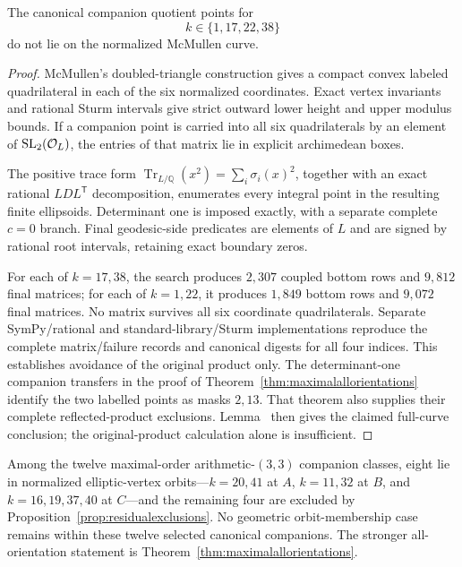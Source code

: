 \begin{proposition}\label{prop:residualexclusions}
The canonical companion quotient points for
\[
 k\in\{1,17,22,38\}
\]
do not lie on the normalized McMullen curve.
\end{proposition}
\begin{proof}
McMullen's doubled-triangle construction gives a compact convex labeled
quadrilateral in each of the six normalized coordinates.  Exact vertex
invariants and rational Sturm intervals give strict outward lower height and
upper modulus bounds.  If a companion point is carried into all six
quadrilaterals by an element of $\mathrm{SL}_2(\mathcal O_L)$, the entries of that
matrix lie in explicit archimedean boxes.

The positive trace form
$\operatorname{Tr}_{L/\mathbb Q}(x^2)=\sum_i\sigma_i(x)^2$, together with an
exact rational $LDL^{\mathsf T}$ decomposition, enumerates every integral
point in the resulting finite ellipsoids.  Determinant one is imposed exactly,
with a separate complete $c=0$ branch.  Final geodesic-side predicates are
elements of $L$ and are signed by rational root intervals, retaining exact
boundary zeros.

For each of $k=17,38$, the search produces $2{,}307$ coupled bottom rows and
$9{,}812$ final matrices; for each of $k=1,22$, it produces $1{,}849$ bottom
rows and $9{,}072$ final matrices.  No matrix survives all six coordinate
quadrilaterals.  Separate SymPy/rational and standard-library/Sturm
implementations reproduce the complete matrix/failure records and canonical
digests for all four indices. This establishes avoidance of the original
product only. The determinant-one companion transfers in the proof of
Theorem~\ref{thm:maximalallorientations} identify the two labelled
points as masks $2,13$. That theorem also supplies their complete
reflected-product exclusions. Lemma~ then gives
the claimed full-curve conclusion; the original-product calculation
alone is insufficient.
\end{proof}

\begin{corollary}\label{cor:maximalgeometrycomplete}
Among the twelve maximal-order arithmetic-$(3,3)$ companion classes, eight
lie in normalized elliptic-vertex orbits---$k=20,41$ at $A$, $k=11,32$ at
$B$, and $k=16,19,37,40$ at $C$---and the remaining four are excluded by
Proposition~\ref{prop:residualexclusions}.  No geometric orbit-membership case remains within these twelve selected
canonical companions. The stronger all-orientation statement is
Theorem~\ref{thm:maximalallorientations}.
\end{corollary}

